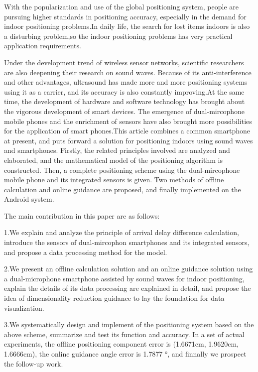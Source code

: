 \documentclass[winfonts]{njuthesis}
\begin{document}
\begin{englishabstract}
	
	With the popularization and use of the global positioning system, people are pursuing higher standards in positioning accuracy, especially in the demand for indoor positioning problems.In daily life, the search for lost items indoors is also a disturbing problem,so the indoor positioning problems has very practical application requirements.
		
	Under the development trend of wireless sensor networks, scientific researchers are also deepening their research on sound waves. Because of its anti-interference and other advantages, ultrasound has made more and more positioning systems using it as a carrier, and its accuracy is also constantly improving.At the same time, the development of hardware and software technology has brought about the vigorous development of smart devices. The emergence of dual-mircophone mobile phones and the enrichment of sensors have also brought more possibilities for the application of smart phones.This article combines a common smartphone at present, and puts forward a solution for positioning indoors using sound waves and smartphones. Firstly, the related principles involved are analyzed and elaborated, and the mathematical model of the positioning algorithm is constructed. Then, a complete positioning scheme using the dual-mircophone mobile phone and its integrated sensors is given. Two methods of offline calculation and online guidance are proposed, and finally implemented on the Android system.

	The main contribution in this paper are as follows: 
	
	1.We explain and analyze the principle of arrival delay difference calculation, introduce the sensors of dual-mircophon smartphones and its integrated sensors, and propose a data processing method for the model.
	
	2.We present an offline calculation solution and an online guidance solution using a dual-microphone smartphone assisted by sound waves for indoor positioning, explain the details of its data processing are explained in detail, and propose the idea of dimensionality reduction guidance to lay the foundation for data visualization.
	
	3.We systematically design and implement of the positioning system based on the above scheme, summarize and test its function and accuracy. In a set of actual experiments, the offline positioning component error is (1.6671cm, 1.9620cm, 1.6666cm), the online guidance angle error is 1.7877 °, and finnally we prospect the follow-up work.

\end{englishabstract}
\end{document}
